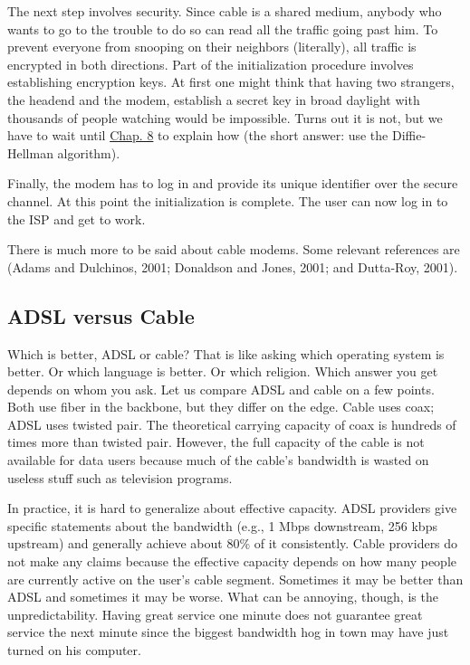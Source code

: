 \documentclass[b5paper,11pt]{memoir}
\begin{document}
The next step involves security. Since cable is a shared medium, anybody
who wants to go to the trouble to do so can read all the traffic going
past him. To prevent everyone from snooping on their neighbors
(literally), all traffic is encrypted in both directions. Part of the
initialization procedure involves establishing encryption keys. At first
one might think that having two strangers, the headend and the modem,
establish a secret key in broad daylight with thousands of people
watching would be impossible. Turns out it is not, but we have to wait
until \protect\hyperlink{0130661023_ch08.htmlux5cux23ch08}{Chap. 8} to
explain how (the short answer: use the Diffie-Hellman algorithm).

Finally, the modem has to log in and provide its unique identifier over
the secure channel. At this point the initialization is complete. The
user can now log in to the ISP and get to work.

There is much more to be said about cable modems. Some relevant
references are (Adams and Dulchinos, 2001; Donaldson and Jones, 2001;
and Dutta-Roy, 2001).

\protect\hypertarget{0130661023_ch02lev1sec7.htmlux5cux23ch02lev2sec29}{}{}

\subsection{ADSL versus Cable}

Which is better, ADSL or cable? That is like asking which operating
system is better. Or which language is better. Or which religion. Which
answer you get depends on whom you ask. Let us compare ADSL and cable on
a few points. Both use fiber in the backbone, but they differ on the
edge. Cable uses coax; ADSL uses twisted pair. The theoretical carrying
capacity of coax is hundreds of times more than twisted pair. However,
the full capacity of the cable is not available for data users because
much of the cable's bandwidth is wasted on useless stuff such as
television programs.

In practice, it is hard to generalize about effective capacity. ADSL
providers give specific statements about the bandwidth (e.g., 1 Mbps
downstream, 256 kbps upstream) and generally achieve about 80\% of it
consistently. Cable providers do not make any claims because the
effective capacity depends on how many people are currently active on
the user's cable segment. Sometimes it may be better than ADSL and
sometimes it may be worse. What can be annoying, though, is the
unpredictability. Having great service one minute does not guarantee
great service the next minute since the biggest bandwidth hog in town
may have just turned on his computer.
\end{document}
